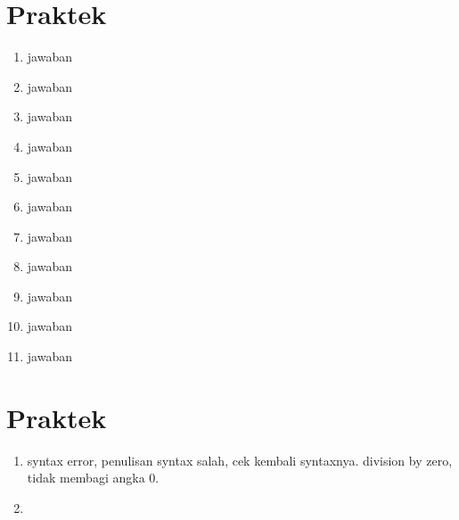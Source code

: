 \section{Praktek}
\begin{enumerate}
\item jawaban


\item jawaban


\item jawaban


\item jawaban


\item jawaban


\item jawaban


\item jawaban


\item jawaban


\item jawaban


\item jawaban


\item jawaban


\end{enumerate}

\section{Praktek}
\begin{enumerate}
\item syntax error, penulisan syntax salah, cek kembali syntaxnya. division by zero, tidak membagi angka 0.
\item 
\end{enumerate}